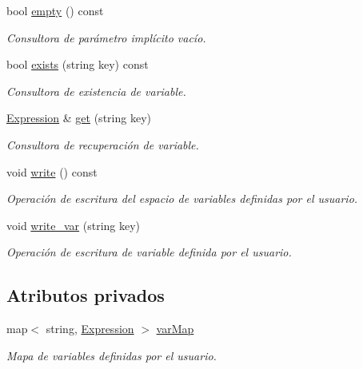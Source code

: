 \begin{DoxyCompactItemize}
bool \hyperlink{class_variable_space_afe850fa6a1dd65e8dffda97d70b7bd93}{empty} () const 
\begin{DoxyCompactList}\small\item\em Consultora de parámetro implícito vacío. \end{DoxyCompactList}\item 
bool \hyperlink{class_variable_space_abb2147dc634abb8256c9c35b7a170b03}{exists} (string key) const 
\begin{DoxyCompactList}\small\item\em Consultora de existencia de variable. \end{DoxyCompactList}\item 
\hyperlink{class_expression}{Expression} \& \hyperlink{class_variable_space_a21b85771487ed047f8716a7fa7df7d1f}{get} (string key)
\begin{DoxyCompactList}\small\item\em Consultora de recuperación de variable. \end{DoxyCompactList}\item 
void \hyperlink{class_variable_space_a98f9eac695830e33d68341515bfd0b4f}{write} () const 
\begin{DoxyCompactList}\small\item\em Operación de escritura del espacio de variables definidas por el usuario. \end{DoxyCompactList}\item 
void \hyperlink{class_variable_space_a15b32633f6bf18d04323ea9f55f40b24}{write\+\_\+var} (string key)
\begin{DoxyCompactList}\small\item\em Operación de escritura de variable definida por el usuario. \end{DoxyCompactList}\end{DoxyCompactItemize}
\subsection*{Atributos privados}
\begin{DoxyCompactItemize}
\item 
map$<$ string, \hyperlink{class_expression}{Expression} $>$ \hyperlink{class_variable_space_a5af4ff4cfb476da8de2ffd88e511dd01}{var\+Map}
\begin{DoxyCompactList}\small\item\em Mapa de variables definidas por el usuario. \end{DoxyCompactList}\end{DoxyCompactItemize}


